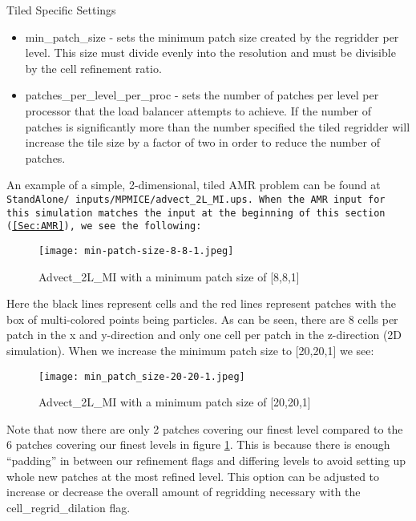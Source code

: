 Tiled Specific Settings
\begin{itemize}
\item min\_patch\_size - sets the minimum patch size created by the
  regridder per level. This size must divide evenly into the
  resolution and must be divisible by the cell refinement ratio.
\item patches\_per\_level\_per\_proc - sets the number of patches per
  level per processor that the load balancer attempts to achieve. If
  the number of patches is significantly more than the number
  specified the tiled regridder will increase the tile size by a
  factor of two in order to reduce the number of patches.
\end{itemize}

An example of a simple, 2-dimensional, tiled AMR problem can be found at \tt StandAlone/
inputs/MPMICE/advect\_2L\_MI.ups. \normalfont When the AMR input for this simulation matches the input at the beginning of this section (\ref{Sec:AMR}), we see the following:

\begin{figure}[H]
  \centering
  \texttt{[image: min-patch-size-8-8-1.jpeg]}
  \caption{Advect\_2L\_MI with a minimum patch size of [8,8,1]}
  \label{fig:881}
\end{figure}

Here the black lines represent cells and the red lines represent patches with the box of multi-colored points being particles. As can be seen, there are 8 cells per patch in the x and y-direction and only one cell per patch in the z-direction (2D simulation). When we increase the minimum patch size to [20,20,1] we see:

\begin{figure}[H]
  \centering
  \texttt{[image: min\_patch\_size-20-20-1.jpeg]}
  \caption{Advect\_2L\_MI with a minimum patch size of [20,20,1]}
  \label{}
\end{figure}

Note that now there are only 2 patches covering our finest level compared to the 6 patches covering our finest levels in figure \ref{fig:881}. This is because there is enough ``padding'' in between our refinement flags and differing levels to avoid setting up whole new patches at the most refined level. This option can be adjusted to increase or decrease the overall amount of regridding necessary with the cell\_regrid\_dilation flag.

